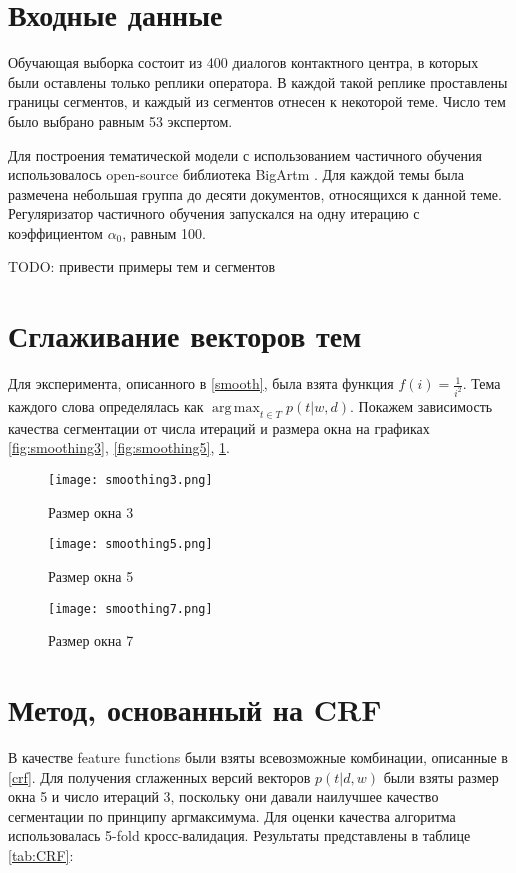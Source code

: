 \documentclass[pdftex,ptm,12pt,a4paper]{report}
\theoremstyle{definition}
\DeclareMathOperator*{\argmax}{arg\,max}
\begin{document}
\section{Входные данные}

Обучающая выборка состоит из 400 диалогов контактного центра, в которых были оставлены только реплики оператора. В каждой такой реплике проставлены границы сегментов, и каждый из сегментов отнесен к некоторой теме. Число тем было выбрано равным 53 экспертом. 

Для построения тематической модели с использованием частичного обучения использовалось open-source библиотека BigArtm \cite{bigartm}. Для каждой темы была размечена небольшая группа до десяти документов, относящихся к данной теме. Регуляризатор частичного обучения запускался на одну итерацию с коэффициентом $\alpha_0$, равным 100. 

TODO: привести примеры тем и сегментов

\section{Сглаживание векторов тем}

Для эксперимента, описанного в \ref{smooth}, была взята функция $f(i) = \frac{1}{i^2}$. Тема каждого слова определялась как $\argmax_{t\in T}p(t|w,d)$.  Покажем зависимость качества сегментации от числа итераций и размера окна на графиках \ref{fig:smoothing3}, \ref{fig:smoothing5}, \ref{fig:smoothing7}.
 
\begin{figure}
	\begin{center}
		\texttt{[image: smoothing3.png]}
		\caption{Размер окна 3}
		\label{fig:smoothing3}
		\texttt{[image: smoothing5.png]}
		\caption{Размер окна 5}
		\label{fig:smoothing5}
		\texttt{[image: smoothing7.png]}
		\caption{Размер окна 7}
		\label{fig:smoothing7}
		
	\end{center}
\end{figure}


\section{Метод, основанный на CRF}

В качестве feature functions были взяты всевозможные комбинации, описанные в \ref{crf}. Для получения сглаженных версий векторов $p(t|d,w)$ были взяты размер окна 5 и число итераций 3, поскольку они давали наилучшее качество сегментации по принципу аргмаксимума. Для оценки качества алгоритма использовалась 5-fold кросс-валидация.
Результаты представлены в таблице \ref{tab:CRF}:
\end{document}
